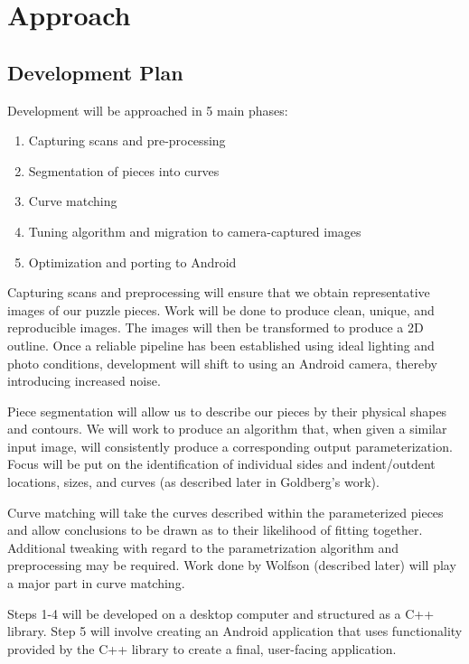 \documentclass[12pt]{report}
\begin{document}
\section*{Approach}

\subsection*{Development Plan}
Development will be approached in 5 main phases:
\begin{enumerate}
\item Capturing scans and pre-processing
\item Segmentation of pieces into curves
\item Curve matching
\item Tuning algorithm and migration to camera-captured images
\item Optimization and porting to Android
\end{enumerate}

Capturing scans and preprocessing will ensure that we obtain representative images of our puzzle pieces. Work will be done to produce clean, unique, and reproducible images. The images will then be transformed to produce a 2D outline. Once a reliable pipeline has been established using ideal lighting and photo conditions, development will shift to using an Android camera, thereby introducing increased noise.

Piece segmentation will allow us to describe our pieces by their physical shapes and contours. We will work to produce an algorithm that, when given a similar input image, will consistently produce a corresponding output parameterization. Focus will be put on the identification of individual sides and indent/outdent locations, sizes, and curves (as described later in Goldberg's work).

Curve matching will take the curves described within the parameterized pieces and allow conclusions to be drawn as to their likelihood of fitting together. Additional tweaking with regard to the parametrization algorithm and preprocessing may be required. Work done by Wolfson (described later) will play a major part in curve matching.

Steps 1-4 will be developed on a desktop computer and structured as a C++ library. Step 5 will involve creating an Android application that uses functionality provided by the C++ library to create a final, user-facing application.
\end{document}
